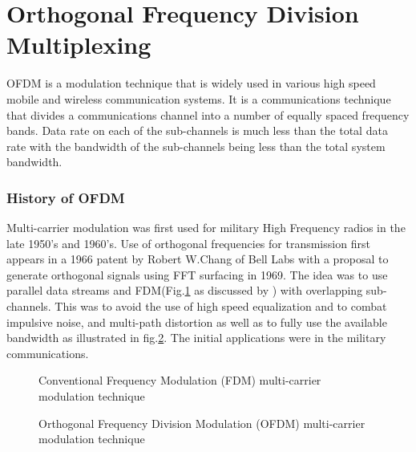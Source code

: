 

\section{Orthogonal Frequency Division Multiplexing}
\gls{OFDM} is a modulation technique that is widely used in various high speed mobile and wireless communication systems. It is a communications technique that divides a communications channel into a number of equally spaced frequency bands. Data rate on each of the sub-channels is much less than the total data rate with the bandwidth of the sub-channels being less than the total system bandwidth. 


\subsubsection*{History of OFDM}
Multi-carrier modulation was first used for military High Frequency radios in the late 1950's and 1960's. Use of orthogonal frequencies for transmission first appears in a 1966 patent by Robert W.Chang of Bell Labs with a proposal to generate orthogonal signals using \gls{FFT} surfacing in 1969. The idea was to use parallel data streams and \gls{FDM}(Fig.\ref{Conv_fdm} as discussed by \cite{ofdm_intro}) with overlapping sub-channels. This was to avoid the use of high speed equalization and to combat impulsive noise, and multi-path distortion as well as to fully use the available bandwidth as illustrated in fig.\ref{Conv_ofdm}\cite{ofdm_intro}. The initial applications were in the military communications.

\begin{figure}[h!]
	\centerline{\resizebox{16cm}{5cm}{}}
	
	\caption{Conventional Frequency Modulation (FDM) multi-carrier modulation technique}
	\label{Conv_fdm}
\end{figure}

\begin{figure}[h!]
	\centerline{\resizebox{16cm}{5cm}{}}
	
	\caption{Orthogonal Frequency Division Modulation (OFDM) multi-carrier modulation technique}
	\label{Conv_ofdm}
\end{figure}

